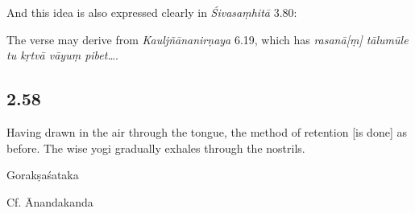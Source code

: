 \begin{ekdosis}
\begin{philcomm}[hp02_057]
\begin{versinnote}
\end{versinnote}

And this idea is also expressed clearly in \emph{Śivasaṃhitā} 3.80:

\begin{versinnote}
\end{versinnote}

The verse may derive from \emph{Kauljñānanirṇaya} 6.19, which has \emph{rasanā[ṃ] tālumūle tu kṛtvā vāyuṃ pibet…}.
\end{philcomm}

\subsection*{2.58}
\begin{translation}[hp02_058]
Having drawn in the air through the tongue, the method of retention [is done] as before. The wise yogi gradually exhales through the nostrils.
\end{translation}

\begin{sources}[hp02_058]
Gorakṣaśataka

\begin{versinnote}
\end{versinnote}
\end{sources}

\begin{testimonia}[hp02_058]
Cf. Ānandakanda

\begin{versinnote}
\end{versinnote}
\end{testimonia}


\end{ekdosis}
